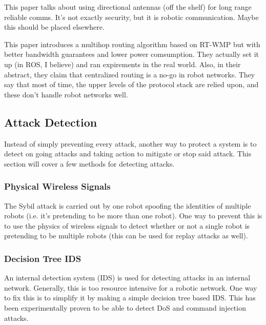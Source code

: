 This paper \cite{Min2013} talks about using directional antennas (off the shelf) for long range reliable comms. It's not exactly security, but it is robotic communication. Maybe this should be placed elsewhere.

This paper \cite{Tardioli2014} introduces a multihop routing algorithm based on RT-WMP but with better bandwidth guarantees and lower power comsumption. They actually set it up (in ROS, I believe) and ran expirements in the real world. Also, in their abstract, they claim that centralized routing is a no-go in robot networks. They say that most of time, the upper levels of the protocol stack are relied upon, and these don't handle robot networks well.



\subsection{Attack Detection}

Instead of simply preventing every attack, another way to protect a system is to detect on going attacks and taking action to mitigate or stop said attack. This section will cover a few methods for detecting attacks.

\subsubsection{Physical Wireless Signals}

The Sybil attack is carried out by one robot spoofing the identities of multiple robots (i.e. it's pretending to be more than one robot). One way to prevent this is to use the physics of wireless signals to detect whether or not a single robot is pretending to be multiple robots (this can be used for replay attacks as well)\cite{Gil2017GuaranteeingSM}.

\subsubsection{Decision Tree IDS}

An internal detection system (IDS) is used for detecting attacks in an internal network. Generally, this is too resource intensive for a robotic network. One way to fix this is to simplify it by making a simple decision tree based IDS\cite{Vuong2015}. This has been experimentally proven to be able to detect DoS and command injection attacks\cite{Vuong2015}.
  
